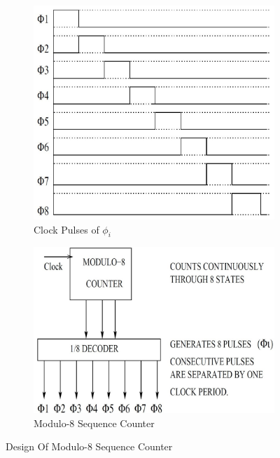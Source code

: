\documentclass[a4paper]{article}
\begin{document}
\begin{figure}[h!]
    \centering
    \begin{subfigure}[b]{0.35\linewidth}
        \centering
        \includegraphics[width=\linewidth]{Pictures/Experiment 5/phase.jpg}
        \caption{Clock Pulses of $\phi_i$}
    \end{subfigure}
    \begin{subfigure}[b]{0.35\linewidth}
        \centering
        \includegraphics[width=\linewidth]{Pictures/Experiment 5/des-mod8-counter.jpg}
        \caption{Modulo-8 Sequence Counter}
    \end{subfigure}
    \caption{Design Of Modulo-8 Sequence Counter}
    \label{Fig:des-mod8}
\end{figure}
\pagebreak
\end{document}
